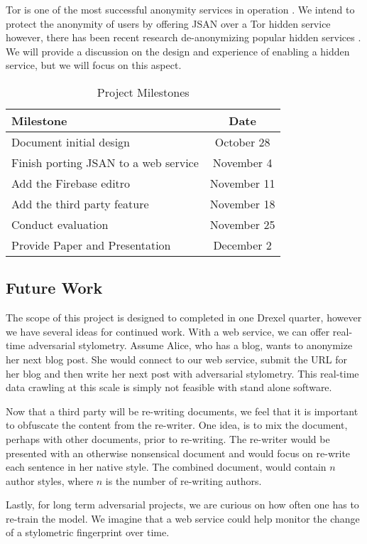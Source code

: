 \documentclass[letterpaper]{article}
\begin{document}
Tor is one of the most successful anonymity services in
operation \cite{Dingledine04tor:the}.  We intend to protect the
anonymity of users by offering JSAN over a Tor hidden service
however, there has been recent research de-anonymizing popular hidden
services \cite{oakland2013-trawling}.  We will provide a discussion on
the design and experience of enabling a hidden service, but we will
focus on this aspect.

\begin{table}
  \centering
  \begin{tabular}{l | c}
    Milestone & Date\\
    \hline

    Document initial design & October 28\\
    Finish porting JSAN to a web service & November 4\\
    Add the Firebase editro & November 11\\
    Add the third party feature & November 18\\
    Conduct evaluation & November 25\\
    Provide Paper and Presentation & December 2

  \end{tabular}
  \caption{Project Milestones}
  \label{tab:milestones}
\end{table}


\subsection*{Future Work}

The scope of this project is designed to completed in one Drexel
quarter, however we have several ideas for continued work.  With a web
service, we can offer real-time adversarial stylometry.  Assume Alice,
who has a blog, wants to anonymize her next blog post.  She would
connect to our web service, submit the URL for her blog and then write
her next post with adversarial stylometry.  This real-time data
crawling at this scale is simply not feasible with stand alone
software.

Now that a third party will be re-writing documents, we feel that it
is important to obfuscate the content from the re-writer.  One idea,
is to mix the document, perhaps with other documents, prior to
re-writing.  The re-writer would be presented with an otherwise
nonsensical document and would focus on re-write each sentence in her
native style.  The combined document, would contain $n$ author styles,
where $n$ is the number of re-writing authors.

Lastly, for long term adversarial projects, we are curious on how often
one has to re-train the model.  We imagine that a web service could
help monitor the change of a stylometric fingerprint over time.




\end{document}

